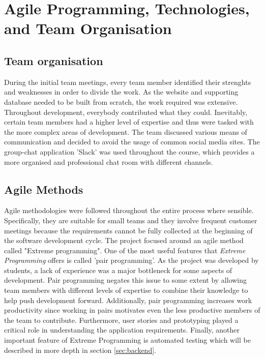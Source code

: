 \documentclass{l3proj}
\begin{document}
\section{Agile Programming, Technologies, and Team Organisation}

\subsection{Team organisation}
\label{sec:organisation}

During the initial team meetings, every team member identified their strenghts and weaknesses in order to divide the work. As the website and supporting database needed to be built from scratch, the work required was extensive. Throughout development, everybody contributed what they could. Inevitably, certain team members had a higher level of expertise and thus were tasked with the more complex areas of development. The team discussed various means of communication and decided to avoid the usage of common social media sites. The group-chat application 'Slack' was used throughout the course, which provides a more organised and professional chat room with different channels.

\subsection{Agile Methods}
\label{sec:agile}

Agile methodologies were followed throughout the entire process where sensible. Specifically, they are suitable for small teams and they involve frequent customer meetings because the requirements cannot be fully collected at the beginning of the software development cycle. The project focused around an agile method called "Extreme programming". One of the most useful features that \textit{Extreme Programming} offers is called 'pair programming'. As the project was developed by students, a lack of experience was a major bottleneck for some aspects of development. Pair programming negates this issue to some extent by allowing team members with different levels of expertise to combine their knowledge to help push development forward. Additionally, pair programming increases work productivity since working in pairs motivates even the less productive members of the team to contribute. Furthermore, user stories and prototyping played a critical role in understanding the application requirements. Finally, another important feature of Extreme Programming is automated testing which will be described in more depth in section \ref{sec:backend}.
\end{document}

